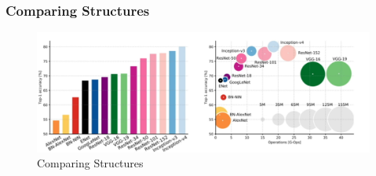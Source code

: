 \documentclass{beamer}
\begin{document}
\begin{frame}
\frametitle{Comparing  Structures}

\begin{figure}
	\includegraphics[width=\linewidth]{Pics/ccomplex.png}
	\caption{Comparing Structures}
\end{figure}

\end{frame}
%
%
%
\end{document}
